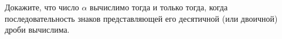 Докажите, что число $\alpha$ вычислимо тогда и только тогда, когда последовательность знаков
представляющей его десятичной (или двоичной) дроби вычислима.
